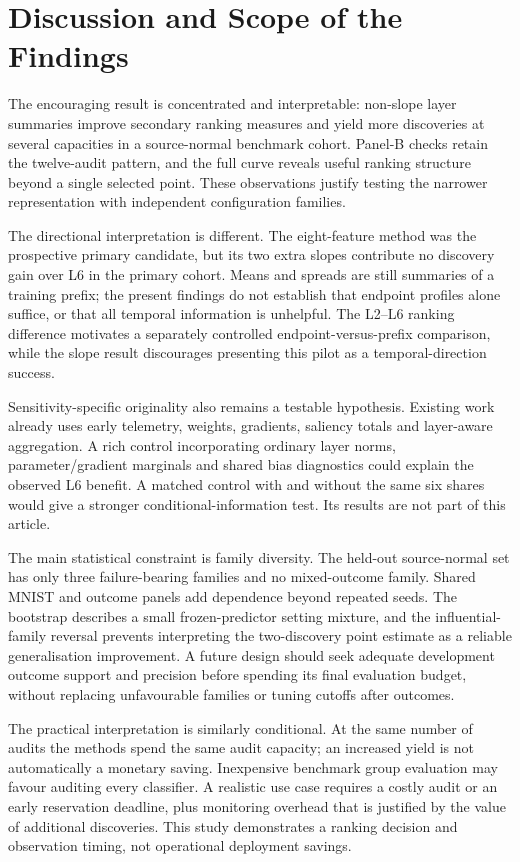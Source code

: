 \documentclass[nolineno]{ieeeaccess}
\begin{document}
\section{Discussion and Scope of the Findings}
\label{sec:discussion}
The encouraging result is concentrated and interpretable: non-slope layer summaries improve secondary ranking measures and yield more discoveries at several capacities in a source-normal benchmark cohort. Panel-B checks retain the twelve-audit pattern, and the full curve reveals useful ranking structure beyond a single selected point. These observations justify testing the narrower representation with independent configuration families.

The directional interpretation is different. The eight-feature method was the prospective primary candidate, but its two extra slopes contribute no discovery gain over L6 in the primary cohort. Means and spreads are still summaries of a training prefix; the present findings do not establish that endpoint profiles alone suffice, or that all temporal information is unhelpful. The L2--L6 ranking difference motivates a separately controlled endpoint-versus-prefix comparison, while the slope result discourages presenting this pilot as a temporal-direction success.

Sensitivity-specific originality also remains a testable hypothesis. Existing work already uses early telemetry, weights, gradients, saliency totals and layer-aware aggregation. A rich control incorporating ordinary layer norms, parameter/gradient marginals and shared bias diagnostics could explain the observed L6 benefit. A matched control with and without the same six shares would give a stronger conditional-information test. Its results are not part of this article.

The main statistical constraint is family diversity. The held-out source-normal set has only three failure-bearing families and no mixed-outcome family. Shared MNIST and outcome panels add dependence beyond repeated seeds. The bootstrap describes a small frozen-predictor setting mixture, and the influential-family reversal prevents interpreting the two-discovery point estimate as a reliable generalisation improvement. A future design should seek adequate development outcome support and precision before spending its final evaluation budget, without replacing unfavourable families or tuning cutoffs after outcomes.

The practical interpretation is similarly conditional. At the same number of audits the methods spend the same audit capacity; an increased yield is not automatically a monetary saving. Inexpensive benchmark group evaluation may favour auditing every classifier. A realistic use case requires a costly audit or an early reservation deadline, plus monitoring overhead that is justified by the value of additional discoveries. This study demonstrates a ranking decision and observation timing, not operational deployment savings.
\end{document}
